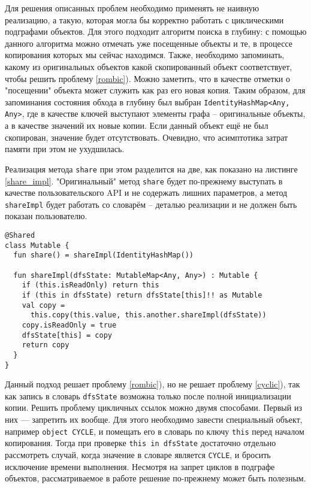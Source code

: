 \documentclass[specification,annotation,times]{itmo-student-thesis}
\begin{document}
Для решения описанных проблем необходимо применять не наивную реализацию,
а такую, которая могла бы корректно работать с циклическими подграфами объектов.
Для этого подходит алгоритм поиска в глубину: с помощью данного алгоритма можно отмечать уже посещенные объекты и те, в процессе копирования которых мы сейчас находимся.
Также, необходимо запоминать, какому из оригинальных объектов какой скопированный объект соответствует, чтобы решить проблему \ref{rombic}). 
Можно заметить, что в качестве отметки о "посещении" объекта может служить как раз его новая копия.
Таким образом, для запоминания состояния обхода в глубину был выбран \texttt{IdentityHashMap<Any, Any>}, где в качестве ключей выступают элементы графа -- оригинальные объекты, а в качестве значений их новые копии. Если данный объект ещё не был скопирован, значение будет отсутствовать.
Очевидно, что асимптотика затрат памяти при этом не ухудшилась.

Реализация метода \texttt{share} при этом разделится на две, как показано на листинге \ref{share_impl}.
"Оригинальный" метод \texttt{share} будет по-прежнему выступать в качестве пользовательского API и не содержать лишних параметров, а метод \texttt{shareImpl} будет работать со словарём -- деталью реализации и не должен быть показан пользователю.

\begin{lstlisting}[float=h!,caption={Усовершенствование share},label={share_impl}]
@Shared
class Mutable {
  fun share() = shareImpl(IdentityHashMap())
    
  fun shareImpl(dfsState: MutableMap<Any, Any>) : Mutable {
    if (this.isReadOnly) return this
	if (this in dfsState) return dfsState[this]!! as Mutable
	val copy = 
	  this.copy(this.value, this.another.shareImpl(dfsState))
	copy.isReadOnly = true
	dfsState[this] = copy
	return copy
  }
}
\end{lstlisting}

Данный подход решает проблему \ref{rombic}), но не решает проблему \ref{cyclic}), так как запись в словарь \texttt{dfsState} возможна только после полной инициализации копии.
Решить проблему цикличных ссылок можно двумя способами. Первый из них --- запретить их вообще. Для этого необходимо завести специальный объект, например \texttt{object CYCLE}, и помещать его в словарь по ключу \texttt{this} перед началом копирования.
Тогда при проверке \texttt{this in dfsState} достаточно отдельно рассмотреть случай, когда значение в словаре является \texttt{CYCLE}, и бросить исключение времени выполнения.
Несмотря на запрет циклов в подграфе объектов, рассматриваемое в работе решение по-прежнему может быть полезным.
\end{document}
